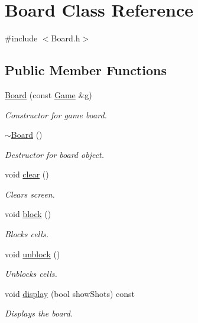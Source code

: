 \hypertarget{class_board}{}\section{Board Class Reference}
\label{class_board}


{\ttfamily \#include $<$Board.\+h$>$}

\subsection*{Public Member Functions}
\begin{DoxyCompactItemize}
\item 
\mbox{\hyperlink{class_board_aa08d83943c9f7c727a96175feb05f1f8}{Board}} (const \mbox{\hyperlink{class_game}{Game}} \&g)
\begin{DoxyCompactList}\small\item\em Constructor for game board. \end{DoxyCompactList}\item 
\mbox{\hyperlink{class_board_af73f45730119a1fd8f6670f53f959e68}{$\sim$\+Board}} ()
\begin{DoxyCompactList}\small\item\em Destructor for board object. \end{DoxyCompactList}\item 
void \mbox{\hyperlink{class_board_af74f0d4b43e5aa3faea16d7c6407b05e}{clear}} ()
\begin{DoxyCompactList}\small\item\em Clears screen. \end{DoxyCompactList}\item 
void \mbox{\hyperlink{class_board_aaf09ad3613729ef00351f2c309e9b6cc}{block}} ()
\begin{DoxyCompactList}\small\item\em Blocks cells. \end{DoxyCompactList}\item 
void \mbox{\hyperlink{class_board_afb89d8a0417a53952ee2b64437282253}{unblock}} ()
\begin{DoxyCompactList}\small\item\em Unblocks cells. \end{DoxyCompactList}\item 
void \mbox{\hyperlink{class_board_a47f5e3908bd99b9cf1a9ed2050b7cfd9}{display}} (bool show\+Shots) const
\begin{DoxyCompactList}\small\item\em Displays the board. \end{DoxyCompactList}\item 

\end{DoxyCompactItemize}
